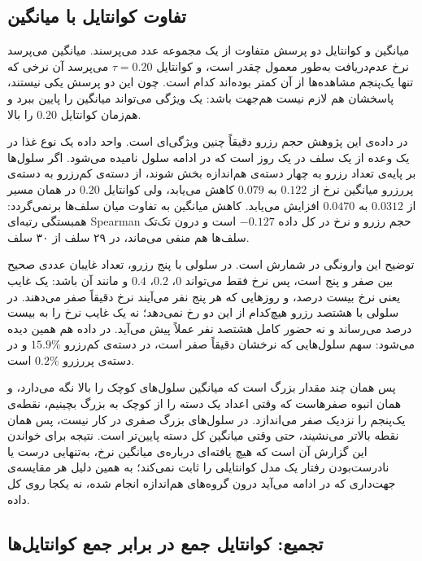 \subsection{تفاوت کوانتایل با میانگین}
\label{sec:2-3-2}

میانگین و کوانتایل دو پرسش متفاوت از یک مجموعه عدد می‌پرسند. میانگین می‌پرسد نرخ
عدم‌دریافت به‌طور معمول چقدر است، و کوانتایل $\tau = 0.20$ می‌پرسد آن نرخی که تنها
یک‌پنجم مشاهده‌ها از آن کمتر بوده‌اند کدام است. چون این دو پرسش یکی نیستند، پاسخشان هم
لازم نیست هم‌جهت باشد: یک ویژگی می‌تواند میانگین را پایین ببرد و هم‌زمان کوانتایل
$0.20$ را بالا.

در داده‌ی این پژوهش حجم رزرو دقیقاً چنین ویژگی‌ای است. واحد داده یک نوع غذا در یک وعده از
یک سلف در یک روز است که در ادامه سلول نامیده می‌شود. اگر سلول‌ها بر پایه‌ی تعداد رزرو به
چهار دسته‌ی هم‌اندازه بخش شوند، از دسته‌ی کم‌رزرو به دسته‌ی پررزرو میانگین نرخ از $0.122$
به $0.079$ کاهش می‌یابد، ولی کوانتایل $0.20$ در همان مسیر از $0.0312$ به $0.0470$
افزایش می‌یابد. کاهش میانگین به تفاوت میان سلف‌ها برنمی‌گردد: همبستگی رتبه‌ای Spearman حجم رزرو و
نرخ در کل داده $-0.127$ است و درون تک‌تک سلف‌ها هم منفی می‌ماند، در ۲۹ سلف از ۳۰ سلف.

توضیح این وارونگی در شمارش است. در سلولی با پنج رزرو، تعداد غایبان عددی صحیح بین صفر و
پنج است، پس نرخ فقط می‌تواند $0$، $0.2$، $0.4$ و مانند آن باشد: یک غایب یعنی نرخ بیست
درصد، و روزهایی که هر پنج نفر می‌آیند نرخ دقیقاً صفر می‌دهند. در سلولی با هشتصد رزرو
هیچ‌کدام از این دو رخ نمی‌دهد؛ نه یک غایب نرخ را به بیست درصد می‌رساند و نه حضور کامل
هشتصد نفر عملاً پیش می‌آید. در داده هم همین دیده می‌شود: سهم سلول‌هایی که نرخشان دقیقاً
صفر است، در دسته‌ی کم‌رزرو $15.9\%$ و در دسته‌ی پررزرو $0.2\%$ است.

پس همان چند مقدار بزرگ است که میانگین سلول‌های کوچک را بالا نگه می‌دارد، و همان انبوه
صفرهاست که وقتی اعداد یک دسته را از کوچک به بزرگ بچینیم، نقطه‌ی یک‌پنجم را نزدیک صفر
می‌اندازد. در سلول‌های بزرگ صفری در کار نیست، پس همان نقطه بالاتر می‌نشیند، حتی وقتی
میانگین کل دسته پایین‌تر است. نتیجه برای خواندن این گزارش آن است که هیچ یافته‌ای درباره‌ی
میانگین نرخ، به‌تنهایی درست یا نادرست‌بودن رفتار یک مدل کوانتایلی را ثابت نمی‌کند؛ به
همین دلیل هر مقایسه‌ی جهت‌داری که در ادامه می‌آید درون گروه‌های هم‌اندازه انجام شده، نه
یکجا روی کل داده.

\subsection{تجمیع: کوانتایل جمع در برابر جمع کوانتایل‌ها}
\label{sec:2-3-3}

